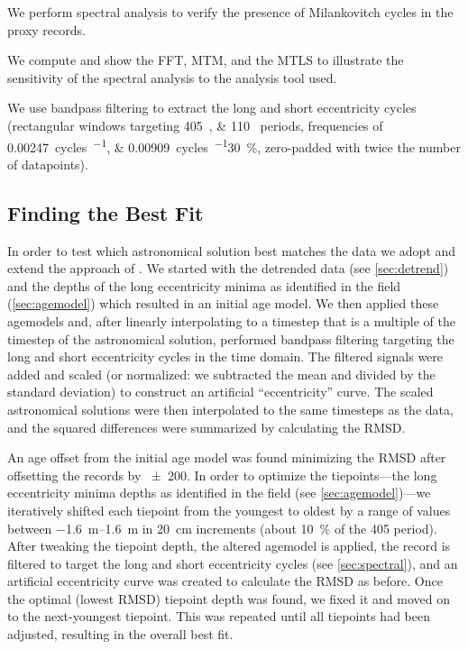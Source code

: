 \documentclass[draft]{agujournal2019}
\begin{document}
We perform spectral analysis to verify the presence of Milankovitch cycles in the proxy records.

We compute and show the \gls{FFT}, %
\gls{MTM}, and the \gls{MTLS} to illustrate the sensitivity of the spectral analysis to the analysis tool used.

We use bandpass filtering to extract the long and short eccentricity cycles (rectangular windows targeting \qtylist{405;110}{\kiloyear} periods, frequencies of \qtylist{0.00247;0.00909}{cycles\per\kiloyear}\textpm\qty{30}{\percent}, zero-padded with twice the number of datapoints).


\subsection{Finding the Best Fit}\label{sec:algorithm}

In order to test which astronomical solution best matches the data we adopt and extend the approach of .
We started with the detrended data (see \cref{sec:detrend}) and the depths of the long eccentricity minima as identified in the field (\cref{sec:agemodel}) which resulted in an initial age model.
We then applied these agemodels and, after linearly interpolating to a timestep that is a multiple of the timestep of the astronomical solution, performed bandpass filtering targeting the long and short eccentricity cycles in the time domain.
The filtered signals were added and scaled (or normalized: we subtracted the mean and divided by the standard deviation) to construct an artificial ``eccentricity'' curve.
The scaled astronomical solutions were then interpolated to the same timesteps as the data, and the squared differences were summarized by calculating the \gls{RMSD}.

An age offset from the initial age model was found minimizing the \gls{RMSD} after offsetting the records by \qty{\pm200}{\kiloyear}.
In order to optimize the tiepoints---the long eccentricity minima depths as identified in the field (see \cref{sec:agemodel})---we iteratively shifted each tiepoint from the youngest to oldest by a range of values between \qtyrange[range-phrase=~to~]{-1.6}{1.6}{\metre} in \qty{20}{\centi\metre} increments (about \qty{10}{\percent} of the \qty{405}{\kiloyear} period).
After tweaking the tiepoint depth, the altered agemodel is applied, the record is filtered to target the long and short eccentricity cycles (see \cref{sec:spectral}), and an artificial eccentricity curve was created to calculate the \gls{RMSD} as before.
Once the optimal (lowest \gls{RMSD}) tiepoint depth was found, we fixed it and moved on to the next-youngest tiepoint.
This was repeated until all tiepoints had been adjusted, resulting in the overall best fit.
\end{document}
